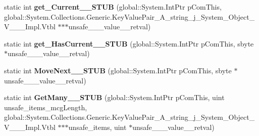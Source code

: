 \begin{DoxyCompactItemize}
\item 
\mbox{\label{struct_windows_1_1_foundation_1_1_collections_1_1_i_iterator___a___system___collections___generi1b6291336687b5a660c835303ec8be78_aadf6d332db165cca1e70267f291259b4}} 
static int {\bfseries get\+\_\+\+Current\+\_\+\+\_\+\+S\+T\+UB} (global\+::\+System.\+Int\+Ptr p\+Com\+This, global\+::\+System.\+Collections.\+Generic.\+Key\+Value\+Pair\+\_\+\+A\+\_\+string\+\_\+j\+\_\+\+System\+\_\+\+Object\+\_\+\+V\+\_\+\+\_\+\+\_\+\+Impl.\+Vtbl $\ast$$\ast$$\ast$unsafe\+\_\+\+\_\+\+\_\+value\+\_\+\+\_\+retval)
\item 
\mbox{\label{struct_windows_1_1_foundation_1_1_collections_1_1_i_iterator___a___system___collections___generi1b6291336687b5a660c835303ec8be78_add443a06ecf2aa75d8bab2ead931996f}} 
static int {\bfseries get\+\_\+\+Has\+Current\+\_\+\+\_\+\+S\+T\+UB} (global\+::\+System.\+Int\+Ptr p\+Com\+This, sbyte $\ast$unsafe\+\_\+\+\_\+\+\_\+value\+\_\+\+\_\+retval)
\item 
\mbox{\label{struct_windows_1_1_foundation_1_1_collections_1_1_i_iterator___a___system___collections___generi1b6291336687b5a660c835303ec8be78_a068db25123b46e77d725ebee9129c322}} 
static int {\bfseries Move\+Next\+\_\+\+\_\+\+S\+T\+UB} (global\+::\+System.\+Int\+Ptr p\+Com\+This, sbyte $\ast$unsafe\+\_\+\+\_\+\+\_\+value\+\_\+\+\_\+retval)
\item 
\mbox{\label{struct_windows_1_1_foundation_1_1_collections_1_1_i_iterator___a___system___collections___generi1b6291336687b5a660c835303ec8be78_a851195ff937680d7755e089305f881be}} 
static int {\bfseries Get\+Many\+\_\+\+\_\+\+S\+T\+UB} (global\+::\+System.\+Int\+Ptr p\+Com\+This, uint unsafe\+\_\+items\+\_\+mcg\+Length, global\+::\+System.\+Collections.\+Generic.\+Key\+Value\+Pair\+\_\+\+A\+\_\+string\+\_\+j\+\_\+\+System\+\_\+\+Object\+\_\+\+V\+\_\+\+\_\+\+\_\+\+Impl.\+Vtbl $\ast$$\ast$$\ast$unsafe\+\_\+items, uint $\ast$unsafe\+\_\+\+\_\+\+\_\+value\+\_\+\+\_\+retval)
\end{DoxyCompactItemize}
